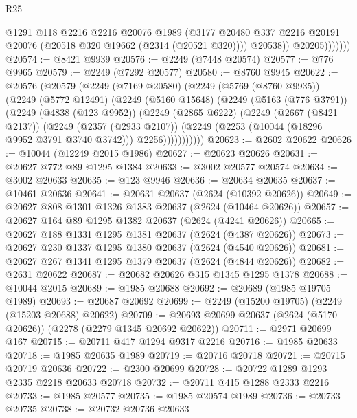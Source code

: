 \begin{lexlean}{R25}
\begin{coremodule}
                      @1291
                      @118
                      @2216
                      @2216
                      @20076
                      @1989
                      (@3177
                        @20480
                        @337
                        @2216
                        @20191
                        @20076
                        (@20518 @320 @19662 (@2314 (@20521 @320))))
                      @20538))
                  @20205)))))))
@20574 := @8421 @9939
@20576 := @2249 (@7448 @20574)
@20577 := @776 @9965
@20579 := @2249 (@7292 @20577)
@20580 := @8760 @9945
@20622 := @20576
    (@20579
      (@2249
        (@7169 @20580)
        (@2249
          (@5769 (@8760 @9935))
          (@2249
            (@5772 @12491)
            (@2249
              (@5160 @15648)
              (@2249
                (@5163 (@776 @3791))
                (@2249
                  (@4838 (@123 @9952))
                  (@2249
                    (@2865 @6222)
                    (@2249
                      (@2667 (@8421 @2137))
                      (@2249
                        (@2357 (@2933 @2107))
                        (@2249 (@2253 (@10044 (@18296 @9952 @3791 @3740 @3742))) @2256)))))))))))
@20623 := @2602 @20622
@20626 := @10044 (@12249 @2015 @1986)
@20627 := @20623 @20626
@20631 := @20627 @772 @89 @1295 @1384
@20633 := @3002 @20577 @20574
@20634 := @3002 @20633
@20635 := @123 @9946
@20636 := @20634 @20635
@20637 := @10461 @20636
@20641 := @20631 @20637 (@2624 (@10392 @20626))
@20649 := @20627 @808 @1301 @1326 @1383 @20637 (@2624 (@10464 @20626))
@20657 := @20627 @164 @89 @1295 @1382 @20637 (@2624 (@4241 @20626))
@20665 := @20627 @188 @1331 @1295 @1381 @20637 (@2624 (@4387 @20626))
@20673 := @20627 @230 @1337 @1295 @1380 @20637 (@2624 (@4540 @20626))
@20681 := @20627 @267 @1341 @1295 @1379 @20637 (@2624 (@4844 @20626))
@20682 := @2631 @20622
@20687 := @20682 @20626 @315 @1345 @1295 @1378
@20688 := @10044 @2015
@20689 := @1985 @20688
@20692 := @20689 (@1985 @19705 @1989)
@20693 := @20687 @20692
@20699 := @2249 (@15200 @19705) (@2249 (@15203 @20688) @20622)
@20709 := @20693 @20699 @20637 (@2624 (@5170 @20626)) (@2278 (@2279 @1345 @20692 @20622))
@20711 := @2971 @20699 @167
@20715 := @20711 @417 @1294 @9317 @2216
@20716 := @1985 @20633
@20718 := @1985 @20635 @1989
@20719 := @20716 @20718
@20721 := @20715 @20719 @20636
@20722 := @2300 @20699
@20728 := @20722 @1289 @1293 @2335 @2218 @20633 @20718
@20732 := @20711 @415 @1288 @2333 @2216
@20733 := @1985 @20577
@20735 := @1985 @20574 @1989
@20736 := @20733 @20735
@20738 := @20732 @20736 @20633

\end{coremodule}
\end{lexlean}
